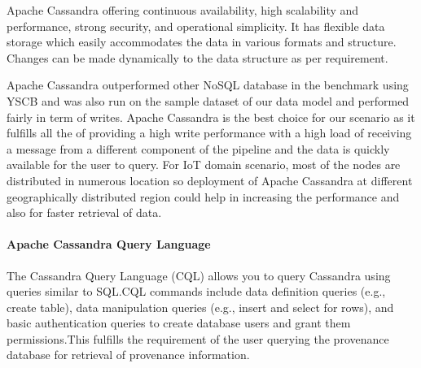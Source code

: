 Apache Cassandra offering continuous availability, high scalability and performance, strong security, and operational simplicity. It has flexible data storage which easily accommodates the data in various formats and structure. Changes can be made dynamically to the data structure as per requirement.


Apache Cassandra outperformed other NoSQL database in the benchmark using YSCB and was also run on the sample dataset of our data model and performed fairly in term of writes. 
Apache Cassandra is the best choice for our scenario as it fulfills all the of providing a high write performance with a high load of receiving a message from a different component of the pipeline and the data is quickly available for the user to query. For IoT domain scenario, most of the nodes are distributed in numerous location so deployment of Apache Cassandra at different geographically distributed region could help in increasing the performance and also for faster retrieval of data.

\paragraph*{Apache Cassandra Query Language}
The Cassandra Query Language (CQL) allows you to query Cassandra using queries similar to SQL.CQL commands include data definition queries (e.g., create table), data manipulation queries (e.g., insert and select for rows), and basic authentication queries to create database users and grant them permissions.This fulfills the requirement of the user querying the provenance database for retrieval of provenance information.






